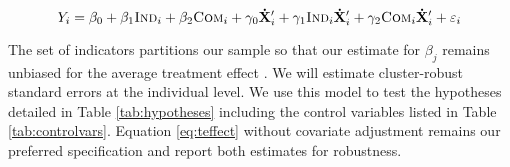 \documentclass[11pt, a4paper]{article}\usepackage[]{graphicx}\usepackage[]{color}
\begin{document}
        \begin{equation} \label{eq:controls}
            Y_{i} = \beta_{0} + \beta_{1}\text{\textsc{Ind}}_{i} + \beta_{2}\text{\textsc{Com}}_{i} + \gamma_{0} \mathbf{\dot X}'_i + \gamma_{1}\text{\textsc{Ind}}_{i} \mathbf{\dot X}'_i + \gamma_{2}\text{\textsc{Com}}_{i} \mathbf{\dot X}'_i + \varepsilon_{i}
        \end{equation}

        The set of indicators partitions our sample so that our estimate for $\beta_j$ remains unbiased for the average treatment effect \parencite{lin_agnostic_2013}. We will estimate cluster-robust standard errors at the individual level. We use this model to test the hypotheses detailed in Table \ref{tab:hypotheses} including the control variables listed in Table \ref{tab:controlvars}. Equation \ref{eq:teffect} without covariate adjustment remains our preferred specification and report both estimates for robustness.

        \begin{table}[h]
        \centering
        \caption{Control variables for covariate adjustment}
        \label{tab:controlvars}
        \end{table}
\end{document}
